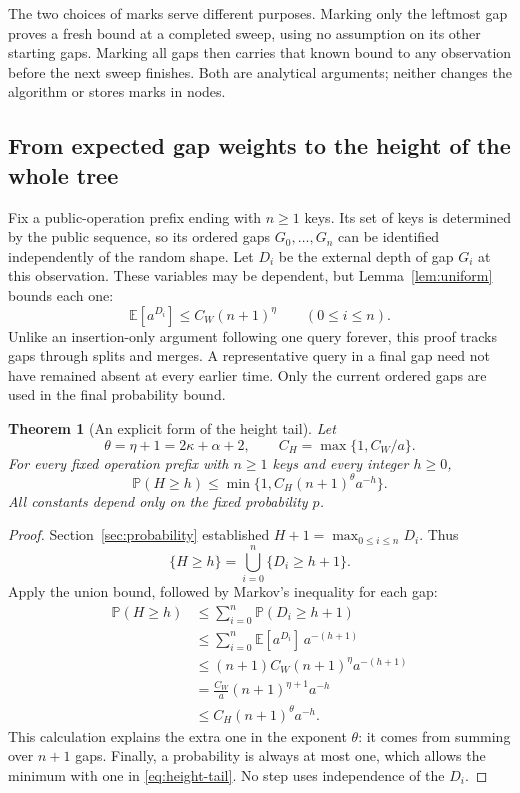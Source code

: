 \documentclass[11pt,a4paper]{article}
\theoremstyle{readable}
\newtheorem{theorem}{Theorem}[section]
\newcommand{\E}{\mathbb E}
\newcommand{\Prob}{\mathbb P}
\begin{document}
The two choices of marks serve different purposes. Marking only the
leftmost gap proves a fresh bound at a completed sweep, using no
assumption on its other starting gaps. Marking all gaps then carries
that known bound to any observation before the next sweep finishes.
Both are analytical arguments; neither changes the algorithm or stores
marks in nodes.

\subsection{From expected gap weights to the height of the whole tree}
\label{sec:height}

Fix a public-operation prefix ending with $n\ge1$ keys. Its set of
keys is determined by the public sequence, so its ordered gaps
$G_0,\ldots,G_n$ can be identified independently of the random shape.
Let $D_i$ be the external depth of gap $G_i$ at this observation.
These variables may be dependent, but Lemma~\ref{lem:uniform} bounds
each one:
\[
  \E[a^{D_i}]\le C_W(n+1)^\eta\qquad(0\le i\le n).
\]
Unlike an insertion-only argument following one query forever, this
proof tracks gaps through splits and merges. A representative query in
a final gap need not have remained absent at every earlier time.
Only the current ordered gaps are used in the final probability bound.

\begin{theorem}[An explicit form of the height tail]
\label{thm:tail}
Let
\[
  \theta=\eta+1=2\kappa+\alpha+2,
  \qquad C_H=\max\{1,C_W/a\}.
\]
For every fixed operation prefix with $n\ge1$ keys and every integer
$h\ge0$,
\begin{equation}
  \Prob(H\ge h)
    \le\min\{1,C_H(n+1)^\theta a^{-h}\}.
  \label{eq:height-tail}
\end{equation}
All constants depend only on the fixed probability $p$.
\end{theorem}

\begin{proof}
Section~\ref{sec:probability} established
$H+1=\max_{0\le i\le n}D_i$. Thus
\[
  \{H\ge h\}=\bigcup_{i=0}^n\{D_i\ge h+1\}.
\]
Apply the union bound, followed by Markov's inequality for each gap:
\begin{align*}
  \Prob(H\ge h)
  &\le\sum_{i=0}^n\Prob(D_i\ge h+1)\\
  &\le\sum_{i=0}^n\E[a^{D_i}]\,a^{-(h+1)}\\
  &\le(n+1)C_W(n+1)^\eta a^{-(h+1)}\\
  &=\frac{C_W}{a}(n+1)^{\eta+1}a^{-h}\\
  &\le C_H(n+1)^\theta a^{-h}.
\end{align*}
This calculation explains the extra one in the exponent $\theta$:
it comes from summing over $n+1$ gaps. Finally, a probability is always
at most one, which allows the minimum with one in
\eqref{eq:height-tail}. No step uses independence of the $D_i$.
\end{proof}
\end{document}
